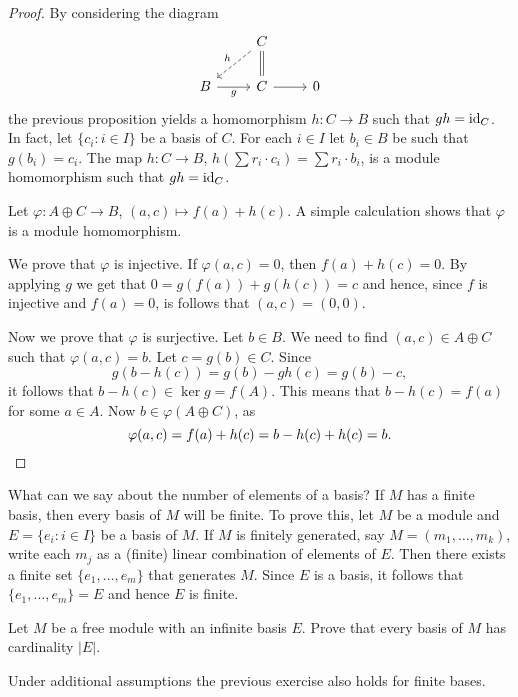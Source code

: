 \begin{proof}
    By considering the diagram
\[\begin{tikzcd}
	& C \\
	B & C & 0
	\arrow["g"', from=2-1, to=2-2]
	\arrow[from=2-2, to=2-3]
	\arrow[equal, no head, from=1-2, to=2-2]
	\arrow["h"', dashed, from=1-2, to=2-1]
\end{tikzcd}\]
	the previous proposition 
	yields a homomorphism $h\colon C\to B$
	such that $gh=\operatorname{id}_C$. In fact, let $\{c_i:i\in I\}$ be a basis of $C$.
	For each $i\in I$ let $b_i\in B$ be such that $g(b_i)=c_i$. The map 
	$h\colon C\to B$, $h(\sum r_i\cdot c_i)=\sum r_i\cdot b_i$, is a module homomorphism 
	such that $gh=\operatorname{id}_C$. 

	Let $\varphi\colon A\oplus C\to B$, $(a,c)\mapsto f(a)+h(c)$. A simple
	calculation shows that $\varphi$ is a module homomorphism. 

	We prove that $\varphi$ is 
	injective. If $\varphi(a,c)=0$, then $f(a)+h(c)=0$. By applying $g$ we get that
	$0=g(f(a))+g(h(c))=c$ and hence, since $f$ is injective and
	$f(a)=0$, is follows that $(a,c)=(0,0)$. 
		
	Now we prove that $\varphi$ is surjective. 
	Let $b\in B$. 
	We need to find $(a,c)\in A\oplus C$ such that $\varphi(a,c)=b$. 
	Let $c=g(b)\in C$. Since
	\[
		g(b-h(c))=g(b)-gh(c)=g(b)-c,
	\]
	it follows that $b-h(c)\in \ker g=f(A)$. This means
	that $b-h(c)=f(a)$ for some $a\in A$. Now $b\in \varphi(A\oplus C)$, as
	\[
		\varphi(a,c)=f(a)+h(c)=b-h(c)+h(c)=b.\qedhere
	\]
\end{proof}

What can we say about the number of elements of a basis? 
If $M$ has a finite basis, then every basis of $M$ will be finite. To prove
this, let $M$ be a module 
and $E=\{e_i:i\in I\}$ be a basis of $M$. If $M$ is finitely generated, say 
$M=(m_1,\dots,m_k)$, write each $m_j$ as a (finite) linear combination of elements
of $E$. Then there exists 
a finite set $\{e_1,\dots,e_m\}$ that generates $M$. Since 
$E$ is a basis, it follows that
$\{e_1,\dots,e_m\}=E$ and hence $E$ is finite.  

\begin{exercise}
\label{xca:cardinality}
    Let $M$ be a free module with an infinite basis $E$. Prove
    that every basis of $M$ has cardinality $|E|$. 
\end{exercise}

Under additional assumptions the previous exercise also holds for 
finite bases. 

